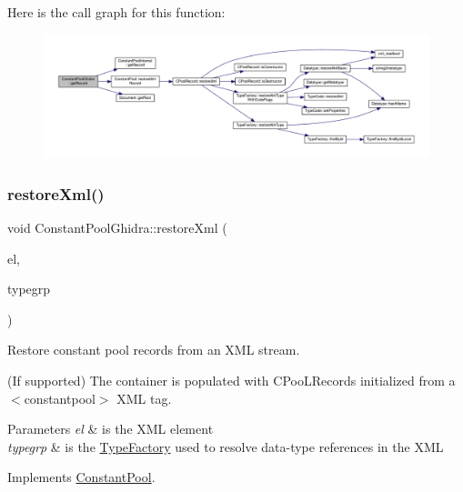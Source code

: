 Here is the call graph for this function\+:
\nopagebreak
\begin{figure}[H]
\begin{center}
\leavevmode
\includegraphics[width=350pt]{class_constant_pool_ghidra_ac4520027014d9d9c6cd6e12b17488f02_cgraph}
\end{center}
\end{figure}
\mbox{\label{class_constant_pool_ghidra_a4054279a4d397dda4a1fb33005c8e445}} 
\subsubsection{\texorpdfstring{restoreXml()}{restoreXml()}}
{\footnotesize\ttfamily void Constant\+Pool\+Ghidra\+::restore\+Xml (\begin{DoxyParamCaption}\item[{const \mbox{\hyperlink{class_element}{Element}} $\ast$}]{el,  }\item[{\mbox{\hyperlink{class_type_factory}{Type\+Factory}} \&}]{typegrp }\end{DoxyParamCaption})\hspace{0.3cm}{\ttfamily [virtual]}}



Restore constant pool records from an X\+ML stream. 

(If supported) The container is populated with C\+Poo\+L\+Records initialized from a $<$constantpool$>$ X\+ML tag. 
\begin{DoxyParams}{Parameters}
{\em el} & is the X\+ML element \\
\hline
{\em typegrp} & is the \mbox{\hyperlink{class_type_factory}{Type\+Factory}} used to resolve data-\/type references in the X\+ML \\
\hline
\end{DoxyParams}


Implements \mbox{\hyperlink{class_constant_pool_a1ba24a59e40a1110cdd5d2a63f1a978c}{Constant\+Pool}}.



